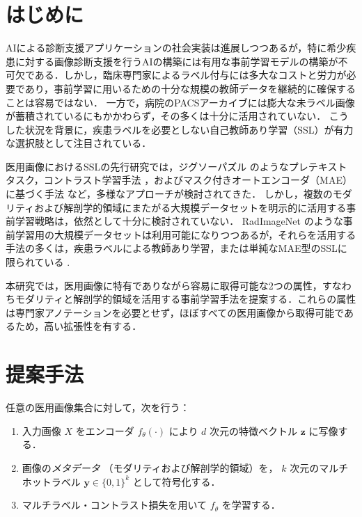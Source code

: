 \def\Style{``jsaiac.sty''}
\def\BibTeX{{\rm B\kern-.05em{\sc i\kern-.025em b}\kern-.08em%
 T\kern-.1667em\lower.7ex\hbox{E}\kern-.125emX}}
\def\JBibTeX{\leavevmode\lower .6ex\hbox{J}\kern-0.15em\BibTeX}
\def\LaTeXe{\LaTeX\kern.15em2$_{\textstyle\varepsilon}$}


\maketitle

\section{はじめに}
AIによる診断支援アプリケーションの社会実装は進展しつつあるが，特に希少疾患に対する画像診断支援を行うAIの構築には有用な事前学習モデルの構築が不可欠である．しかし，臨床専門家によるラベル付与には多大なコストと労力が必要であり，事前学習に用いるための十分な規模の教師データを継続的に確保することは容易ではない．
一方で，病院のPACSアーカイブには膨大な未ラベル画像が蓄積されているにもかかわらず，その多くは十分に活用されていない．
こうした状況を背景に，疾患ラベルを必要としない自己教師あり学習（SSL）が有力な選択肢として注目されている．

医用画像におけるSSLの先行研究では，ジグソーパズル \cite{sugawara_breast_2025} のようなプレテキストタスク，コントラスト学習手法 \cite{wu_distributed_2022}，およびマスク付きオートエンコーダ（MAE）に基づく手法 \cite{zhuang_mim_2025} など，多様なアプローチが検討されてきた．
しかし，複数のモダリティおよび解剖学的領域にまたがる大規模データセットを明示的に活用する事前学習戦略は，依然として十分に検討されていない． 
RadImageNet \cite{mei_radimagenet_2022} のような事前学習用の大規模データセットは利用可能になりつつあるが，それらを活用する手法の多くは，疾患ラベルによる教師あり学習，または単純なMAE型のSSLに限られている \cite{mei_radimagenet_2022}\cite{liu2024vis}.

本研究では，医用画像に特有でありながら容易に取得可能な2つの属性，すなわちモダリティと解剖学的領域を活用する事前学習手法を提案する．これらの属性は専門家アノテーションを必要とせず，ほぼすべての医用画像から取得可能であるため，高い拡張性を有する．

\section{提案手法}
任意の医用画像集合に対して，次を行う：

\begin{enumerate}
  \item 入力画像 $X$ をエンコーダ $f_{\theta}(\cdot)$ により
        $d$ 次元の特徴ベクトル $\mathbf z$ に写像する．
  \item 画像の\emph{メタデータ}
        （モダリティおよび解剖学的領域）を，
        $k$ 次元のマルチホットラベル
        $\mathbf y\in\{0,1\}^{k}$ として符号化する．
  \item マルチラベル・コントラスト損失を用いて $f_{\theta}$ を学習する．
\end{enumerate}

